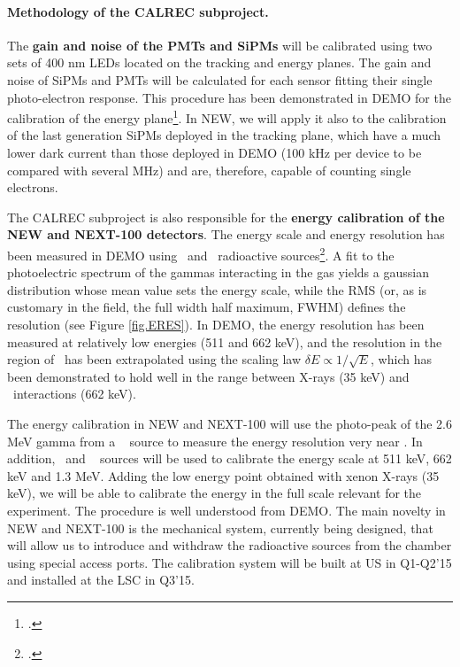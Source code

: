\paragraph{Methodology of the CALREC subproject.}

The {\bf gain and noise of the PMTs and SiPMs} will be calibrated using two sets of 400 nm LEDs located on the tracking and energy planes. The gain and noise of SiPMs and PMTs will be calculated for each sensor fitting their single photo-electron response. This procedure has been demonstrated in DEMO for the calibration of the energy plane\footcite{Lorca:2014sra}. In NEW, we will apply it also to the calibration of the last generation SiPMs deployed in the tracking plane, which have a much lower dark current than those deployed in DEMO (100 kHz per device to be compared with several MHz) and are, therefore, capable of counting single electrons.

The CALREC subproject is also responsible for the {\bf energy calibration of the NEW and NEXT-100 detectors}. The energy scale and energy resolution has been measured in DEMO using \NA\ and \CS\ radioactive sources\footcite{Alvarez:2012nd,Alvarez:2013gxa}. A fit to the photoelectric spectrum of the gammas interacting in the gas yields a gaussian distribution whose mean value sets the energy scale, while the RMS (or, as is customary in the field, the full width half maximum, FWHM) defines the resolution (see Figure \ref{fig.ERES}). In DEMO, the energy resolution has been measured at relatively low energies (511 and 662 keV), and the resolution in the region of \Qbb\ has been extrapolated using the scaling law $\delta E \propto 1/\sqrt{E}$, which has been demonstrated to hold well in the range between X-rays (35 keV) and \CS\ interactions (662 keV). 

The energy calibration in NEW and NEXT-100 will use the photo-peak of the 2.6 MeV gamma from a \Tl~  source to measure the energy resolution very near \Qbb. In addition, \NA\ and \CS~ sources will be used to calibrate the energy scale at  511 keV, 662 keV and 1.3 MeV. Adding the low energy point obtained with xenon X-rays (35 keV), we will be able to calibrate the energy in the full scale relevant for the experiment. The procedure is well understood from DEMO. The main novelty in NEW and NEXT-100 is the mechanical system, currently being designed, that will allow us to introduce and withdraw the radioactive sources from the chamber using special access ports. The calibration system will be built at US in Q1-Q2'15 and installed at the LSC in Q3'15.

